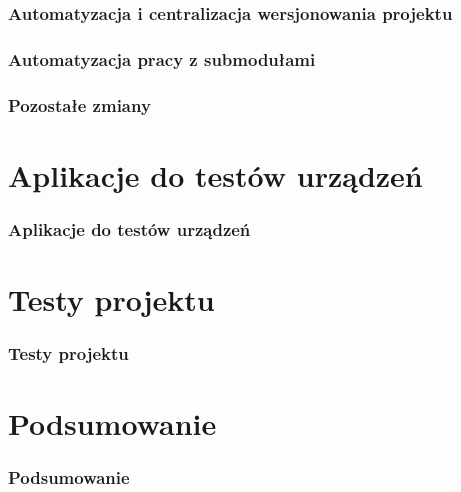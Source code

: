 \documentclass[10pt]{beamer}
\begin{document}
\begin{frame}
\frametitle{Automatyzacja i centralizacja wersjonowania projektu}
\end{frame}

\begin{frame}
\frametitle{Automatyzacja pracy z submodułami}
\end{frame}

\begin{frame}
\frametitle{Pozostałe zmiany}
\end{frame}

\section{Aplikacje do testów urządzeń}

\begin{frame}
\frametitle{Aplikacje do testów urządzeń}
\end{frame}

\section{Testy projektu}

\begin{frame}
\frametitle{Testy projektu}
\end{frame}

\section{Podsumowanie}

\begin{frame}
\frametitle{Podsumowanie}
\end{frame}
\end{document}
